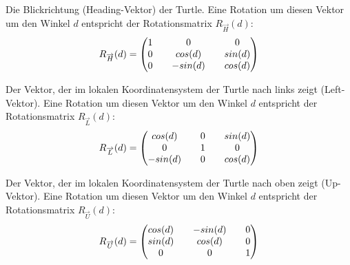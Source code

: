 \begin{description}[labelindent]
		\item[\boldmath$\overrightarrow{H}$]Die Blickrichtung (Heading-Vektor) der Turtle. Eine Rotation um diesen Vektor um den Winkel $d$ entspricht der Rotationsmatrix $R_{\overrightarrow{H}}(d)$:\\
		\begin{equation}
		R_{\overrightarrow{H}}(d) = 
		\setlength\arraycolsep{10pt}
		\begin{pmatrix}
		1	 	& 0			& 0 \\
		0		& cos(d)	& sin(d) \\
		0 		& -sin(d)	& cos(d)
		\end{pmatrix}	
		\label{eq:rotH}
		\end{equation} 
		
		\item[\boldmath$\overrightarrow{L}$] Der Vektor, der im lokalen Koordinatensystem der Turtle nach links zeigt (Left-Vektor). Eine Rotation um diesen Vektor um den Winkel $d$ entspricht der Rotationsmatrix $R_{\overrightarrow{L}}(d)$:\\
		\begin{equation}
		R_{\overrightarrow{L}}(d) = 
		\setlength\arraycolsep{10pt}
		\begin{pmatrix}
		cos(d) 	& 0		 	& sin(d) \\
		0		& 1			& 0 \\
		-sin(d)	& 0 		&  cos(d)
		\end{pmatrix}	
		\label{eq:rotL}
		\end{equation} 
		
		\item[\boldmath$\overrightarrow{U}$]Der Vektor, der im lokalen Koordinatensystem der Turtle nach oben zeigt (Up-Vektor). Eine Rotation um diesen Vektor um den Winkel $d$ entspricht der Rotationsmatrix $R_{\overrightarrow{U}}(d)$:\\
		\begin{equation}
		R_{\overrightarrow{U}}(d) = 
		\setlength\arraycolsep{10pt}
		\begin{pmatrix}
		cos(d) 	& -sin(d) 	& 0 \\
		sin(d)	& cos(d) 	& 0 \\
		0 		& 0 		& 1
		\end{pmatrix}	
		\label{eq:rotU}
		\end{equation} 
		
	
\end{description}
\cite[S.19]{ABOP:04} \cite[S.69]{Deussen:05} \\

